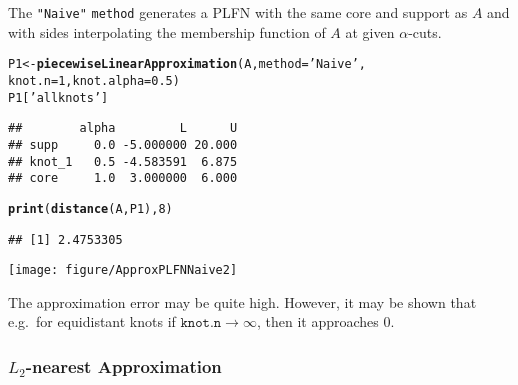 \documentclass[11pt]{article}\usepackage[]{graphicx}\usepackage[]{color}
\makeatletter
\newcommand{\hlnum}[1]{\textcolor[rgb]{0.686,0.059,0.569}{#1}}%
\newcommand{\hlstr}[1]{\textcolor[rgb]{0.192,0.494,0.8}{#1}}%
\newcommand{\hlstd}[1]{\textcolor[rgb]{0.345,0.345,0.345}{#1}}%
\newcommand{\hlkwb}[1]{\textcolor[rgb]{0.69,0.353,0.396}{#1}}%
\newcommand{\hlkwc}[1]{\textcolor[rgb]{0.333,0.667,0.333}{#1}}%
\newcommand{\hlkwd}[1]{\textcolor[rgb]{0.737,0.353,0.396}{\textbf{#1}}}%
\newenvironment{kframe}{%
 \def\at@end@of@kframe{}%
 \ifinner\ifhmode%
  \def\at@end@of@kframe{\end{minipage}}%
  \begin{minipage}{\columnwidth}%
 \fi\fi%
 \def\FrameCommand##1{\hskip\@totalleftmargin \hskip-\fboxsep
 \colorbox{shadecolor}{##1}\hskip-\fboxsep
     \hskip-\linewidth \hskip-\@totalleftmargin \hskip\columnwidth}%
 \MakeFramed {\advance\hsize-\width
   \@totalleftmargin\z@ \linewidth\hsize
   \@setminipage}}%
 {\par\unskip\endMakeFramed%
 \at@end@of@kframe}
\newenvironment{knitrout}{}{} %
\newcommand{\argument}[1]{\texttt{\hlkwc{#1}}}
\newcommand{\str}[1]{\texttt{\hlstr{#1}}}
\makeatother
\begin{document}
The \str{"{}Naive"{}} \argument{method} generates a PLFN with the same
core and support as $A$ and with sides interpolating the membership function
of $A$ at given $\alpha$-cuts.

\begin{knitrout}\small
{}\color{fgcolor}\begin{kframe}
\begin{alltt}
\hlstd{P1} \hlkwb{<-} \hlkwd{piecewiseLinearApproximation}\hlstd{(A,} \hlkwc{method}\hlstd{=}\hlstr{'Naive'}\hlstd{,}
         \hlkwc{knot.n}\hlstd{=}\hlnum{1}\hlstd{,} \hlkwc{knot.alpha}\hlstd{=}\hlnum{0.5}\hlstd{)}
\hlstd{P1[}\hlstr{'allknots'}\hlstd{]}
\end{alltt}
\begin{verbatim}
##        alpha         L      U
## supp     0.0 -5.000000 20.000
## knot_1   0.5 -4.583591  6.875
## core     1.0  3.000000  6.000
\end{verbatim}
\begin{alltt}
\hlkwd{print}\hlstd{(}\hlkwd{distance}\hlstd{(A, P1),} \hlnum{8}\hlstd{)}
\end{alltt}
\begin{verbatim}
## [1] 2.4753305
\end{verbatim}
\end{kframe}
\end{knitrout}

\begin{center}
\begin{knitrout}\small
{}\color{fgcolor}

{\centering \texttt{[image: figure/ApproxPLFNNaive2]} 

}



\end{knitrout}
\end{center}

\noindent
The approximation error may be quite high.
However, it may be shown that e.g.~for equidistant knots if
$\mathtt{knot.n}\to\infty$,
then it approaches $0$.

\subsubsection{$L_2$-nearest Approximation}

\end{document}
